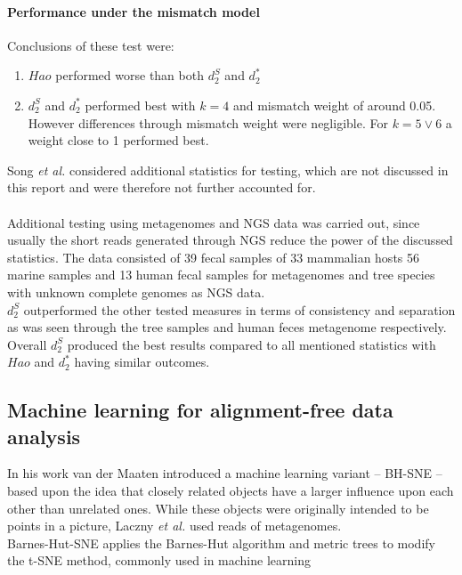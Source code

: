 \documentclass[twocolumn]{bmcart}%
\begin{document}
\paragraph*{Performance under the mismatch model}
Conclusions of these test were: 
\begin{enumerate}
\item $Hao$ performed worse than both $d_2^S$ and $d_2^*$	
\item $d_2^S$ and $d_2^*$ performed best with $k=4$ and mismatch weight of around 0.05. However differences through mismatch weight were negligible. For $k=5 \lor 6$ a weight close to 1 performed best.
\end{enumerate}
Song \textit{et al.} considered additional statistics for testing, which are not discussed in this report and were therefore not further accounted for.\\
\\
Additional testing using metagenomes and NGS data was carried out\cite{doi:10.1093/bib/bbt067}, since usually the short reads generated through NGS reduce the power of the discussed statistics. The data consisted of 39 fecal samples of 33 mammalian hosts\cite{muegge2011diet} 56 marine samples\cite{rusch2007sorcerer} and 13 human fecal samples\cite{kurokawa2007comparative} for metagenomes and tree species with unknown complete genomes as NGS data.\\
$d_2^S$ outperformed the other tested measures in terms of consistency and separation as was seen through the tree samples and human feces metagenome respectively. \\
Overall $d_2^S$ produced the best results compared to all mentioned statistics with $Hao$ and $d_2^*$ having similar outcomes.
\subsection*{Machine learning for alignment-free data analysis}
In his work van der Maaten\cite{DBLP:journals/corr/abs-1301-3342} introduced a machine learning variant -- BH-SNE --  based upon the idea that closely related objects have a larger influence upon each other than unrelated ones. While these objects were originally intended to be points in a picture, Laczny \textit{et al.}\cite{Laczny2014} used reads of metagenomes.\\
Barnes-Hut-SNE applies the Barnes-Hut algorithm and metric trees to modify the t-SNE method, commonly used in machine learning
\end{document}

